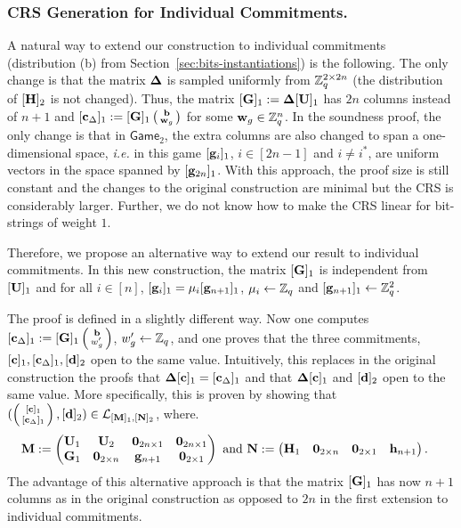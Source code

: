 \subsubsection{CRS Generation for Individual Commitments.}
A natural way to extend our construction to individual commitments (distribution (b) from Section~\ref{sec:bits-instantiations}) is the following. The only change is that the matrix $\mathbf{{\Delta}}$ is sampled uniformly from  $\mathbb{Z}_q^{2 \times 2n}$ (the distribution of $[{\mathbf{{H}}}]_2$ is not changed). Thus, the matrix 
$[\mathbf{{G}}]_1:=\mathbf{{\Delta}} [\mathbf{{U}}]_1$ has $2n$ columns instead of $n+1$ and 
$[\mathbf{c}_{\Delta}]_1 := [\mathbf{{G}}]_1 \left(\begin{smallmatrix}\mathbf{b} \\ \mathbf{w}_g\end{smallmatrix}\right)$ for some $\mathbf{w}_g \in \mathbb{Z}_q^{n}$.   
In the soundness proof, the only change is that in $\mathsf{Game}_2$, the extra columns are also changed to span a one-dimensional space, \textit{i.e.} in this game $[\mathbf{g}_{i}]_1$, $i \in [2n-1]$ and $i \neq i^*$, are uniform vectors in the space spanned by $[\mathbf{g}_{2n}]_1$.
With this approach, the proof size is still constant and the changes to the original construction are minimal but the CRS is considerably larger. Further, we do not know how to make the CRS linear for bit-strings of weight $1$. 

Therefore, we propose an alternative way to extend our result to individual commitments.
In this new construction, the matrix $[\mathbf{{G}}]_1$ is independent from $[\mathbf{{U}}]_1$ and for all $i \in [n]$, $[\mathbf{g}_{i}]_1 = \mu_i [\mathbf{g}_{n+1}]_1$, $\mu_i \gets \mathbb{Z}_q$ and   $[\mathbf{g}_{n+1}]_1\gets\mathbb{Z}_q^2$. 

The proof is defined in a slightly different way. Now one computes $[\mathbf{c}_\Delta]_1:=[\mathbf{{G}}]_1\left(\begin{smallmatrix}\mathbf{b}\\w'_g\end{smallmatrix}\right)$, $w'_g\gets\mathbb{Z}_q$, and one proves that the three commitments, $[\mathbf{c}]_1,[\mathbf{c}_\Delta]_1,[\mathbf{d}]_2$ open to the same value.  Intuitively, this replaces in the original construction the proofs that $\mathbf{{\Delta}}[\mathbf{c}]_1=[\mathbf{c}_\Delta]_1$ and that $\mathbf{{\Delta}}[\mathbf{c}]_1$ and $[\mathbf{d}]_2$ open to the same value. More specifically, this is proven by showing that $(\left(\begin{smallmatrix}{[\mathbf{c}]_1}\\{[\mathbf{c}_\Delta]_1}\end{smallmatrix}\right), [\mathbf{d}]_2)\in\mathcal{L}_{[\mathbf{{M}}]_1,[\mathbf{{N}}]_2}$, where.
\begin{align*}
&\mathbf{{M}} := 
\left(\begin{matrix}
    \mathbf{{U}}_1 & \mathbf{{U}}_2           & \mathbf{{0}}_{2n\times 1} & \mathbf{{0}}_{2n\times 1}\\
    \mathbf{G}_1      & \mathbf{{0}}_{2\times n} & \mathbf{g}_{n+1}             & \mathbf{{0}}_{2\times 1}\\
\end{matrix}\right)
\text{ and }
\mathbf{{N}} :=
\left(\begin{matrix}
    \mathbf{H}_1      & \mathbf{{0}}_{2\times n} & \mathbf{{0}}_{2\times 1}  & \mathbf{h}_{n+1}
\end{matrix}\right).
\end{align*}
The advantage of this alternative approach is that the matrix $[\mathbf{{G}}]_1$ has now $n+1$ columns as in the original construction as opposed to $2n$ in the first extension to individual commitments.  



